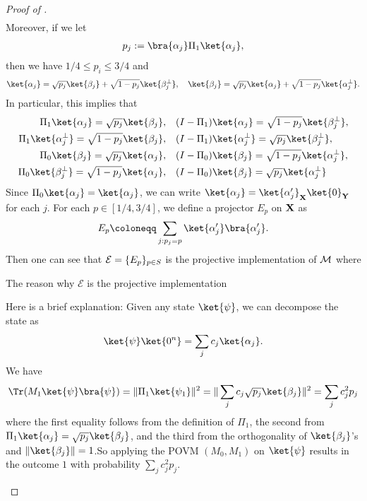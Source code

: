 \begin{proof}[Proof of ]
\begin{align*}
\end{align*}
Moreover, if we let 
\begin{align*}
    p_j\defeq \bra{\alpha_j}\Pi_1 \ket{\alpha_j},
\end{align*}
then we have $1/4\le p_i \le 3/4$ and
\begin{align*}
\ket{\alpha_j}=\sqrt{p_j}\ket{\beta_j}+\sqrt{1-p_j}\ket{\beta_j^{\bot}},~~~
\ket{\beta_j}=\sqrt{p_j}\ket{\alpha_j}+\sqrt{1-p_j}\ket{\alpha_j^{\bot}}.
\end{align*} 
In particular, this implies that 
\begin{align}
\label{eq:transition_alpha_beta}
\begin{split}
\Pi_1\ket{\alpha_j}=\sqrt{p_j}\ket{\beta_j},~~~ &(I-\Pi_1)\ket{\alpha_j}=\sqrt{1-p_j}\ket{\beta_j^\bot},\\
\Pi_1\ket{\alpha_j^\bot}=\sqrt{1-p_j}\ket{\beta_j},~~~ &(I-\Pi_1)\ket{\alpha_j^\bot}=\sqrt{p_j}\ket{\beta_j^\bot},\\
\Pi_0\ket{\beta_j}=\sqrt{p_j}\ket{\alpha_j},~~~ &(I-\Pi_0)\ket{\beta_j}=\sqrt{1-p_j}\ket{\alpha_j^\bot},\\
\Pi_0\ket{\beta_j^\bot}=\sqrt{1-p_j}\ket{\alpha_j},~~~ &(I-\Pi_0)\ket{\beta_j}=\sqrt{p_j}\ket{\alpha_j^\bot}
\end{split}
\end{align}
Since $\Pi_0\ket{\alpha_j}=\ket{\alpha_j}$, we can write $\ket{\alpha_j}=\ket{\alpha'_j}_{\regX}\ket{0}_{\regY}$ for each $j$. 
For each $p\in [1/4,3/4]$, 
we define a projector $E_p$ on $\mathbf{X}$ as 
$$
E_p \coloneqq \sum_{j:p_j=p} \ket{\alpha'_j}\bra{\alpha'_j}. 
$$
Then one can see that $\mathcal{E}=\{E_p\}_{p\in S}$ is the projective implementation of $\mathcal{M}$ where 

\begin{takashienv}{The reason why $\mathcal{E}$ is the projective implementation}
    {Here is a brief explanation:
Given any state $\ket{\psi}$, we can decompose the state as
\[
\ket{\psi}\ket{0^n}=\sum_{j} c_j \ket{\alpha_j}.
\]
We have 
\[
\Tr(M_1\ket{\psi}\bra{\psi})=\|\Pi_1\ket{\psi_1}\|^2
=\|\sum_{j} c_j \sqrt{p_j} \ket{\beta_j}\|^2
=\sum_{j} c_j^2 p_j
\]
where the first equality follows from the definition of $\Pi_1$, the second from $\Pi_1\ket{\alpha_j}=\sqrt{p_j} \ket{\beta_j}$, 
and the third from the orthogonality of $\ket{\beta_j}$'s and $\|\ket{\beta_j}\|=1$.So applying the POVM $(M_0,M_1)$ on $\ket{\psi}$ results in the outcome $1$ with probability  $\sum_{j} c_j^2 p_j$.

}
\end{takashienv}
\end{proof}
